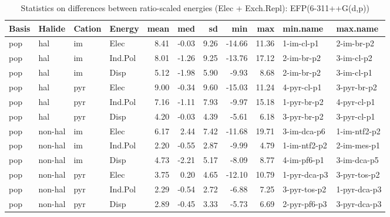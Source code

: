 \documentclass[a4paper]{article}
\begin{document}
\begin{table}[ht]
\centering
\begin{tabular}{llllrrrrrll}
  \hline
Basis & Halide & Cation & Energy & mean & med & sd & min & max & min.name & max.name \\ 
  \hline
pop & hal & im & Elec & 8.41 & -0.03 & 9.26 & -14.66 & 11.36 & 1-im-cl-p1 & 2-im-br-p2 \\ 
  pop & hal & im & Ind.Pol & 8.01 & -1.26 & 9.25 & -13.76 & 17.12 & 2-im-br-p2 & 3-im-cl-p2 \\ 
  pop & hal & im & Disp & 5.12 & -1.98 & 5.90 & -9.93 & 8.68 & 2-im-br-p2 & 3-im-cl-p1 \\ 
  pop & hal & pyr & Elec & 9.00 & -0.34 & 9.60 & -15.03 & 11.24 & 4-pyr-cl-p1 & 3-pyr-br-p2 \\ 
  pop & hal & pyr & Ind.Pol & 7.16 & -1.11 & 7.93 & -9.97 & 15.18 & 1-pyr-br-p2 & 4-pyr-cl-p1 \\ 
  pop & hal & pyr & Disp & 4.20 & -0.03 & 4.39 & -5.61 & 6.18 & 3-pyr-br-p2 & 3-pyr-cl-p1 \\ 
  pop & non-hal & im & Elec & 6.17 & 2.44 & 7.42 & -11.68 & 19.71 & 3-im-dca-p6 & 1-im-ntf2-p2 \\ 
  pop & non-hal & im & Ind.Pol & 2.20 & -0.55 & 2.87 & -9.99 & 4.79 & 1-im-ntf2-p2 & 2-im-mes-p1 \\ 
  pop & non-hal & im & Disp & 4.73 & -2.21 & 5.17 & -8.09 & 8.77 & 4-im-pf6-p1 & 3-im-dca-p5 \\ 
  pop & non-hal & pyr & Elec & 3.75 & 0.20 & 4.65 & -12.10 & 10.79 & 1-pyr-dca-p3 & 3-pyr-tos-p2 \\ 
  pop & non-hal & pyr & Ind.Pol & 2.29 & -0.54 & 2.72 & -6.88 & 7.25 & 3-pyr-tos-p2 & 1-pyr-dca-p3 \\ 
  pop & non-hal & pyr & Disp & 2.89 & -0.45 & 3.33 & -5.73 & 6.69 & 2-pyr-pf6-p3 & 3-pyr-dca-p3 \\ 
   \hline
\end{tabular}
\caption{Statistics on differences between ratio-scaled energies (Elec + Exch.Repl): EFP(6-311++G(d,p))}
\end{table}
\end{document}
